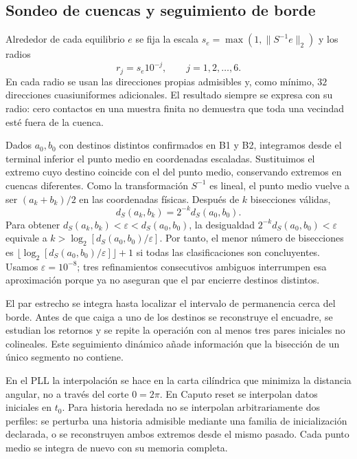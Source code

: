 \ifHAFOBasinMaterial
\subsection{Sondeo de cuencas y seguimiento de borde}
\label{camp:edge-tracking}

Alrededor de cada equilibrio \(e\) se fija la escala
\(s_e=\max(1,\lVert S^{-1}e\rVert_2)\) y los radios
\begin{equation}
 r_j=s_e10^{-j},\qquad j=1,2,\ldots,6.
 \label{camp:eq-equilibrium-radii}
\end{equation}
En cada radio se usan las direcciones propias admisibles y, como mínimo,
\(32\) direcciones cuasiuniformes adicionales. El resultado siempre se
expresa con su radio: cero contactos en una muestra finita no demuestra que
toda una vecindad esté fuera de la cuenca.

Dados \(a_0,b_0\) con destinos distintos confirmados en B1 y B2,
integramos desde el terminal inferior el punto medio en coordenadas
escaladas. Sustituimos el extremo cuyo destino coincide con el del punto
medio, conservando extremos en cuencas diferentes. Como la transformación
\(S^{-1}\) es lineal, el punto medio vuelve a ser \((a_k+b_k)/2\) en las
coordenadas físicas. Después de \(k\) bisecciones válidas,
\begin{equation}
 d_S(a_k,b_k)=2^{-k}d_S(a_0,b_0).
 \label{camp:eq-edge-bisection-width}
\end{equation}
Para obtener \(d_S(a_k,b_k)<\varepsilon<d_S(a_0,b_0)\), la desigualdad
\(2^{-k}d_S(a_0,b_0)<\varepsilon\) equivale a
\(k>\log_2[d_S(a_0,b_0)/\varepsilon]\). Por tanto, el menor número de
bisecciones es \(\lfloor\log_2[d_S(a_0,b_0)/\varepsilon]\rfloor+1\)
si todas las clasificaciones son concluyentes. Usamos
\(\varepsilon=10^{-8}\); tres refinamientos consecutivos ambiguos interrumpen esa
aproximación porque ya no aseguran que el par encierre destinos distintos.

El par estrecho se integra hasta localizar el intervalo de permanencia
cerca del borde. Antes de que caiga a uno de los destinos se reconstruye
el encuadre, se estudian los retornos y se repite la operación con al menos
tres pares iniciales no colineales. Este seguimiento dinámico añade
información que la bisección de un único segmento no contiene.

En el PLL la interpolación se hace en la carta cilíndrica que minimiza la
distancia angular, no a través del corte \(0=2\pi\). En Caputo reset se
interpolan datos iniciales en \(t_0\). Para historia heredada no se interpolan
arbitrariamente dos perfiles: se perturba una historia admisible mediante una
familia de inicialización declarada, o se reconstruyen ambos extremos desde
el mismo pasado. Cada punto medio se integra de nuevo con su memoria completa.


